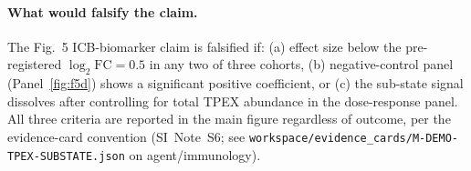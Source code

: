 \paragraph{What would falsify the claim.}
The Fig.~5 ICB-biomarker claim is falsified if: (a) effect size below the pre-registered $\log_2 \text{FC} = 0.5$ in any two of three cohorts, (b) negative-control panel (Panel~\ref{fig:f5d}) shows a significant positive coefficient, or (c) the sub-state signal dissolves after controlling for total TPEX abundance in the dose-response panel. All three criteria are reported in the main figure regardless of outcome, per the evidence-card convention (SI~Note~S6; see \texttt{workspace/evidence\_cards/M-DEMO-TPEX-SUBSTATE.json} on agent/immunology).
